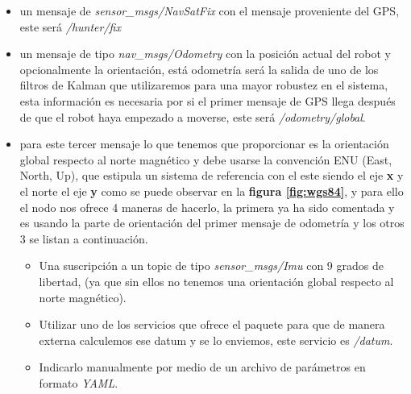 \begin{itemize}
    \item un mensaje de \textit{sensor\_msgs/NavSatFix} con el mensaje proveniente del GPS, este será \textit{/hunter/fix}
    \item un mensaje de tipo \textit{nav\_msgs/Odometry} con la posición actual del robot y opcionalmente la orientación, está odometría 
será la salida de uno de los filtros de Kalman que utilizaremos para una mayor robustez en el sistema, esta información es necesaria por 
si el primer mensaje de GPS llega después de que el robot haya empezado a moverse, este será \textit{/odometry/global}.
    \item para este tercer mensaje lo que tenemos que proporcionar es la orientación global respecto al norte magnético y debe usarse la 
convención ENU (East, North, Up), que estipula un sistema de referencia con el este siendo el eje \textbf{x} y el norte el eje \textbf{y} 
como se puede observar en la \textbf{figura \ref{fig:wgs84}}, y para ello el nodo nos ofrece 4 maneras de hacerlo, la primera ya ha sido 
comentada y es usando la parte de orientación del primer mensaje de odometría y los otros 3 se listan a continuación.
        \begin{itemize}
            \item Una suscripción a un topic de tipo \textit{sensor\_msgs/Imu} con 9 grados de libertad, (ya que sin ellos no tenemos una 
orientación global respecto al norte magnético).
            \item Utilizar uno de los servicios que ofrece el paquete para que de manera externa calculemos ese datum y se lo enviemos, 
este servicio es \textit{/datum}.
            \item Indicarlo manualmente por medio de un archivo de parámetros en formato \textit{YAML}.
        \end{itemize}
\end{itemize}



